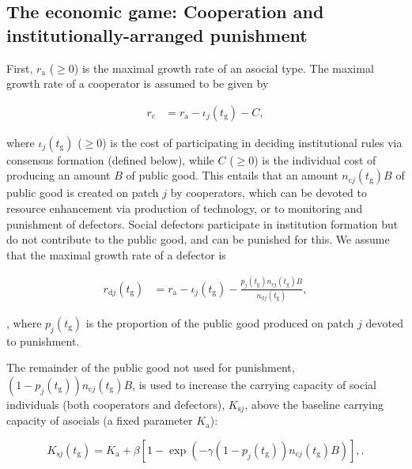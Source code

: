 \documentclass{rstb}
\begin{document}
\begin{linenumbers}
\subsection*{The economic game: Cooperation and institutionally-arranged punishment}
First, $r_{\mathrm{a}}$  ($\geq 0$) is the maximal growth rate of an asocial type. The maximal growth rate of a cooperator is assumed to be given by
\begin{linenomath}
\begin{align}
r_{\mathrm{c}}&=r_{\mathrm{a}} -\iota_j(t_\mathrm{g}) -C \label{eqnrc},
\end{align}
\end{linenomath}
where $\iota_j(t_\mathrm{g})$ ($\geq 0$) is the cost of participating in deciding institutional rules via consensus formation (defined below), while $C$ ($\geq 0$) is the individual cost of producing an amount $B$ of public good. This entails that an amount $n_{\mathrm{c}j}(t_\mathrm{g})B$ of public good is created on patch $j$ by cooperators, which can be devoted to resource enhancement via production of technology, or to monitoring and punishment of defectors. Social defectors participate in institution formation but do not contribute to the public good, and can be punished for this. We assume that the maximal growth rate of a defector is 
\begin{linenomath}
\begin{align}
r_{\mathrm{d}j}(t_\mathrm{g})&=r_{\mathrm{a}} -\iota_j(t_\mathrm{g})  - \frac{p_j(t_\mathrm{g})n_{\mathrm{c}j}(t_\mathrm{g})B}{n_{\mathrm{d}j}\left(t_\mathrm{g}\right)} \label{eqnrd},
\end{align}
\end{linenomath},
where $p_j(t_\mathrm{g})$ is the proportion of the public good produced on patch $j$ devoted to punishment. 

The remainder of the public good not used for punishment, $(1-p_j(t_\mathrm{g})) n_{\mathrm{c}j}(t_\mathrm{g})B$, is used to increase the carrying capacity of social individuals (both cooperators and defectors), $K_{\mathrm{s}j}$, above the baseline carrying capacity of asocials (a fixed parameter $K_\mathrm{a}$):
\begin{linenomath*}
\begin{equation}
K_{\mathrm{s}j}(t_\mathrm{g}) = K_\mathrm{a} + \beta \left[1-\exp \left(-\gamma (1-p_j(t_\mathrm{g}))n_{\mathrm{c}j}(t_\mathrm{g})B \right) \right],\label{eqnKg}.
\end{equation}
\end{linenomath*}


\end{linenumbers}
\end{document}
